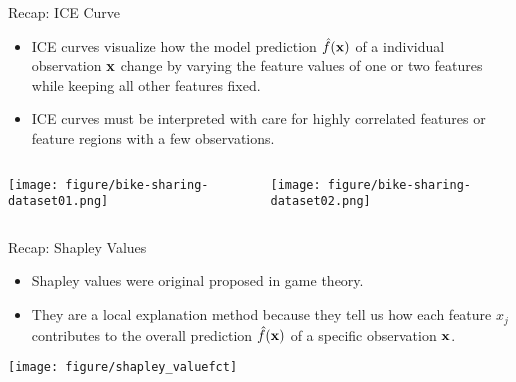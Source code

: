 \documentclass[11pt,compress,t,notes=noshow, aspectratio=169, xcolor=table]{beamer}
\begin{document}
\begin{vbframe}{Recap: ICE Curve}
		\begin{itemize}
		\item ICE curves visualize how the model prediction $\hat{f}(\mathbf{x})$ of a individual observation $\mathbf{x}$ change by varying the feature values of one or two features while keeping all other features fixed. 
		\item ICE curves must be interpreted with care for highly correlated features or feature regions with a few observations. 
	\end{itemize}
\vspace{0.5cm}
\begin{columns}
	\begin{column}{0.47\textwidth}
		\texttt{[image: figure/bike-sharing-dataset01.png]}
	\end{column}
	\begin{column}{0.47\textwidth}
		\texttt{[image: figure/bike-sharing-dataset02.png]}
	\end{column}
\end{columns}
\end{vbframe}

\begin{vbframe}{Recap: Shapley Values}
	\begin{itemize}
		\item Shapley values were original proposed in game theory.
		\item They are a local explanation method because they tell us how each feature $x_j$ contributes to the overall prediction $\hat{f}(\mathbf{x})$ of a specific observation $\mathbf{x}$. 
	\end{itemize}
\vspace{0.5cm}
\begin{center}
	\texttt{[image: figure/shapley\_valuefct]}
\end{center}
\end{vbframe}
\end{document}
